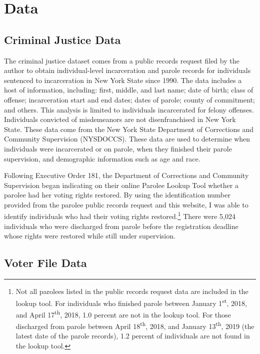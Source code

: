 \documentclass[
  12pt,
]{article}
\begin{document}
\hypertarget{data}{%
\section*{Data}\label{data}}

\hypertarget{criminal-justice-data}{%
\subsection*{Criminal Justice Data}\label{criminal-justice-data}}

The criminal justice dataset comes from a public records request filed by the author to obtain individual-level incarceration and parole records for individuals sentenced to incarceration in New York State since 1990. The data includes a host of information, including: first, middle, and last name; date of birth; class of offense; incarceration start and end dates; dates of parole; county of commitment; and others. This analysis is limited to individuals incarcerated for felony offenses. Individuals convicted of misdemeanors are not disenfranchised in New York State. These data come from the New York State Department of Corrections and Community Supervision (NYSDOCCS). These data are used to determine when individuals were incarcerated or on parole, when they finished their parole supervision, and demographic information such as age and race.

Following Executive Order 181, the Department of Corrections and Community Supervision began indicating on their online Parolee Lookup Tool whether a parolee had her voting rights restored. By using the identification number provided from the parolee public records request and this website, I was able to identify individuals who had their voting rights restored.\footnote{Not all parolees listed in the public records request data are included in the lookup tool. For individuals who finished parole between January 1\textsuperscript{st}, 2018, and April 17\textsuperscript{th}, 2018, 1.0 percent are not in the lookup tool. For those discharged from parole between April 18\textsuperscript{th}, 2018, and January 13\textsuperscript{th}, 2019 (the latest date of the parole records), 1.2 percent of individuals are not found in the lookup tool.} There were 5,024 individuals who were discharged from parole before the registration deadline whose rights were restored while still under supervision.

\hypertarget{voter-file-data}{%
\subsection*{Voter File Data}\label{voter-file-data}}
\end{document}
